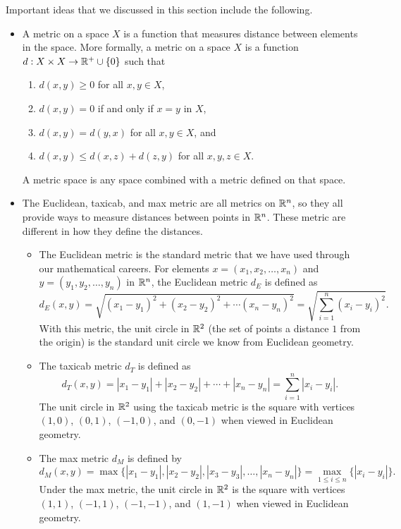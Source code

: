 {
Important ideas that we discussed in this section include the following.
\begin{itemize}
\item A metric on a space $X$ is a function that measures distance between elements in the space. More formally, a metric on a space $X$ is a function $d: X \times X \to \mathbb{R}^+ \cup \{0\}$ such that 
	\begin{enumerate}
	\item $d(x,y) \geq 0$ for all $x,y \in X$,
	\item $d(x,y) = 0$ if and only if $x = y$ in $X$,
	\item $d(x,y) = d(y,x)$ for all $x, y \in X$, and
	\item $d(x,y) \leq d(x,z) + d(z,y)$ for all $x,y,z \in X$.
	\end{enumerate}
A metric space is any space combined with a metric defined on that space.

\item The Euclidean, taxicab, and max metric are all metrics on $\mathbb{R}^n$, so they all provide ways to measure distances between points in $\mathbb{R}^n$. These metric are different in how they define the distances. 

	\begin{itemize}
	\item The Euclidean metric is the standard metric that we have used through our mathematical careers. For elements $x = (x_1, x_2, \ldots, x_n)$ and $y = (y_1, y_2, \ldots, y_n)$ in $\mathbb{R}^n$, the Euclidean metric $d_E$ is defined as
\[d_E(x,y) =  \sqrt{(x_1-y_1)^2 + (x_2-y_2)^2 + \cdots (x_n-y_n)^2} = \sqrt{\sum_{i=1}^n (x_i-y_i)^2}.\]
With this metric, the unit circle in $\mathbb{R}^2$ (the set of points a distance $1$ from the origin) is the standard unit circle we know from Euclidean geometry. 

	\item The taxicab metric $d_T$ is defined as
\[d_T(x,y) = |x_1-y_1| + |x_2-y_2| + \cdots + |x_n-y_n| = \sum_{i=1}^n |x_i-y_i|.\]
The unit circle in $\mathbb{R}^2$ using the taxicab metric is the square with vertices $(1,0)$, $(0,1)$, $(-1,0)$, and $(0,-1)$ when viewed in Euclidean geometry. 

	\item The max metric $d_M$ is defined by 
\[d_M(x,y) = \max\{| x_1-y_1 |, | x_2-y_2 |, |x_3-y_3|, \ldots, |x_n-y_n| \} = \max_{1 \leq i \leq n} \{|x_i-y_i|\}.\]
Under the max metric, the unit circle in $\mathbb{R}^2$ is the square with vertices $(1,1)$, $(-1,1)$, $(-1,-1)$, and $(1,-1)$ when viewed in Euclidean geometry.


\end{itemize}
\end{itemize}}
